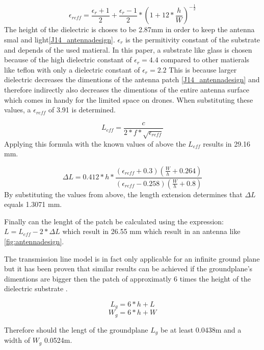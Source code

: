 $$\epsilon_{reff} = \frac{\epsilon_r+1}{2}+  \frac{\epsilon_r-1}{2} * \left(1+12*\frac{h}{W}\right)^{-\frac{1}{2}}$$
The height of the dielectric is choses to be 2.87mm in order to keep the antenna smal and light\ref{J14_antennadesign}.
$\epsilon_r$ is the permitivity constant of the substrate and depends of the used matieral. In this paper, a substrate like glass is chosen because of the high dielectric constant of $\epsilon_r = 4.4$ compared to other matierals like teflon with only a dielectric constant of $\epsilon_r = 2.2$
This is because larger dielectric decreases the dimentions of the antenna patch \ref{J14_antennadesign} and therefore indirectly also decreases the dimentions of the entire antenna surface which comes in handy for the limited space on drones. When substituting these values, a $\epsilon_{reff}$ of 3.91 is determined.

\begin{equation} 
L_{eff} = \frac{c}{2*f*\sqrt{\epsilon_{reff}}}
\end{equation}
Applying this formula with the known values of above the $L_{eff}$ results in 29.16 mm.

\begin{equation} 
\Delta L = 0.412*h*\frac{(\epsilon_{reff}+0.3)\left(\frac{W}{h}+0.264\right)}{\left(\epsilon_{reff}-0.258\right)\left(\frac{W}{h}+0.8\right)}
\end{equation}
By substituting the values from above, the length extension determines that $\Delta L$ equals 1.3071 mm.

Finally can the lenght of the patch be calculated using the expression: $L = L_{eff} - 2 * \Delta L$
which result in 26.55 mm which result in an antenna like \ref{fig:antennadesign}.

The transmission line model is in fact only applicable for an infinite ground plane but it has been proven that similar results
can be achieved if the groundplane's dimentions are bigger then the patch of approximatly 6 times the height of the dielectric substrate \cite{J14_antennadesign,J15_antennadesign}.

\begin{equation} 
L_{g} = 6 * h + L
\end{equation}
\begin{equation} 
W_{g} = 6 * h + W
\end{equation}

Therefore should the lengt of the groundplane $L_{g}$ be at least 0.0438m and a width of $W_{g}$ 0.0524m.


